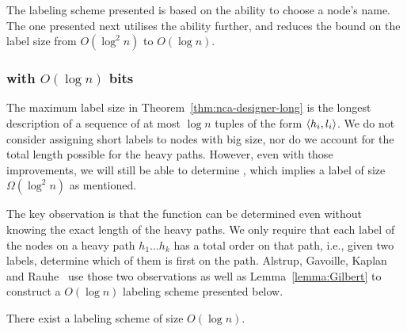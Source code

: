 		The  labeling scheme presented is based on the ability  to choose a node's name. The one presented next utilises the ability further, and reduces the bound on the label size from $O(\log^2 n)$  to $O (\log n)$.
		\subsubsection{\NCAl with $O(\log n)$ bits}
		The maximum label size in Theorem~\ref{thm:nca-designer-long} is the longest description  of a sequence of at most $\log n$ tuples of the form $\left \langle h_i,l_i \right \rangle $.
		 We do not  consider  assigning short labels to nodes with big size, nor do we account for the total length possible for the heavy paths.
		 However, even with those improvements, we will still be able to determine \seplevel, which implies a label of size $\Omega(\log^2 n)$ as mentioned.
		 
		 The key observation is that the function \NCA can be  determined even without knowing the exact length of the heavy paths.
		 We only require that each label of the nodes on a heavy path  $h_1 \dots h_k$ has a total order on that path, i.e., given two labels, determine which of them is first on the path.
		 Alstrup, Gavoille, Kaplan and Rauhe~  use those two  observations  as well as   Lemma~\ref{lemma:Gilbert}  to construct  a $O(\log n)$  \NCAl  labeling scheme presented below.

		\begin{theorem}\cite{Alstrup02NCA}\label{thm:nca-short}
		There exist a \NCAl labeling scheme  of  size  $O (\log n)$.
		\end{theorem}
		
